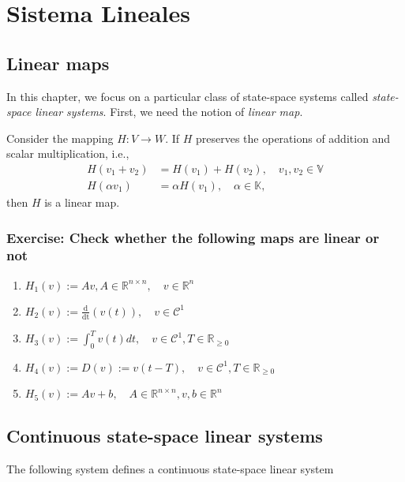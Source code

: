 \chapter{Sistema Lineales}

\section{Linear maps}

In this chapter, we focus on a particular class of state-space systems called \emph{state-space linear systems}. First, we need the notion of \emph{linear map}.

\begin{definition} Consider the mapping $H: V \to W$. If $H$ preserves the operations of addition and scalar multiplication, i.e.,
\begin{align}
	H(v_1+v_2) &= H(v_1) + H(v_2), \quad v_1, v_2\in\mathbb{V} \nonumber \\
	H(\alpha v_1) &= \alpha H(v_1), \quad \alpha\in\mathbb{K} \nonumber,
\end{align}
then $H$ is a linear map.
\end{definition}

\subsection{Exercise: Check whether the following maps are linear or not}

\begin{enumerate}
	\item $H_1(v) := Av, A\in\mathbb{R}^{n\times n}, \quad v\in\mathbb{R}^n$
	\item $H_2(v) := \frac{\mathrm{d}}{\mathrm{dt}}(v(t)), \quad v\in\mathcal{C}^1$
	\item $H_3(v) := \int_0^T v(t) dt, \quad v\in\mathcal{C}^1, T\in\mathbb{R}_{\geq 0}$
	\item $H_4(v) := D(v) := v(t - T), \quad v\in\mathcal{C}^1, T\in\mathbb{R}_{\geq 0}$
	\item $H_5(v) := Av + b, \quad A\in\mathbb{R}^{n\times n}, v,b\in\mathbb{R}^n$
\end{enumerate}

\section{Continuous state-space linear systems}

The following system defines a continuous state-space linear system

